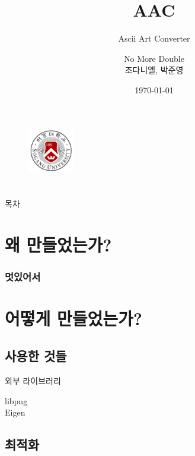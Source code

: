 \documentclass{beamer}
\title{AAC}
\subtitle{Ascii Art Converter}
\author{No More Double \\ 조다니엘, 박준영}
\institute{Sogang University \\ CSE2035/AIE2051}
\date{\today}
\begin{document}
\section{}
	\begin{frame}{}
		\titlepage
		\begin{figure}
			\vspace{-1em}
			\includegraphics[width=2cm]{sogang_university_logo}
			\vspace{1em}
		\end{figure}
	\end{frame}
\section{}

\section{}
	\begin{frame}{목차}
		\tableofcontents
	\end{frame}
\section{}

\section{왜 만들었는가?}
	\begin{frame}
		\frametitle{멋있어서}
	\end{frame}
\section{어떻게 만들었는가?}
\subsection{사용한 것들}
	\begin{frame}{외부 라이브러리}
		\begin{description}
			\item[libpng]
			\item[Eigen]

		\end{description}
	\end{frame}
\subsection{최적화}
\end{document}
